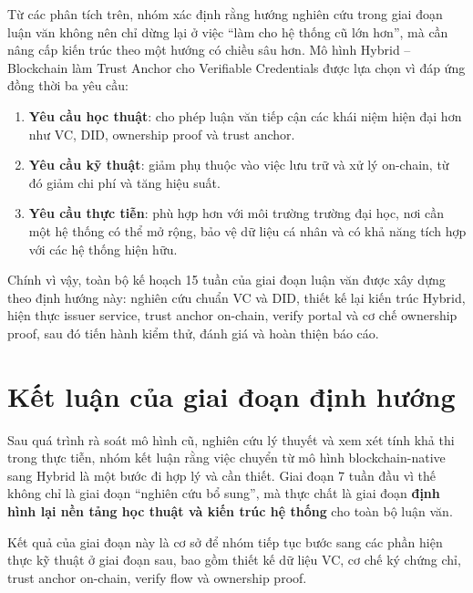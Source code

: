 Từ các phân tích trên, nhóm xác định rằng hướng nghiên cứu trong giai đoạn luận văn không nên chỉ dừng lại ở việc ``làm cho hệ thống cũ lớn hơn'', mà cần nâng cấp kiến trúc theo một hướng có chiều sâu hơn. Mô hình Hybrid -- Blockchain làm Trust Anchor cho Verifiable Credentials được lựa chọn vì đáp ứng đồng thời ba yêu cầu:

\begin{enumerate}
    \item \textbf{Yêu cầu học thuật}: cho phép luận văn tiếp cận các khái niệm hiện đại hơn như VC, DID, ownership proof và trust anchor.
    \item \textbf{Yêu cầu kỹ thuật}: giảm phụ thuộc vào việc lưu trữ và xử lý on-chain, từ đó giảm chi phí và tăng hiệu suất.
    \item \textbf{Yêu cầu thực tiễn}: phù hợp hơn với môi trường trường đại học, nơi cần một hệ thống có thể mở rộng, bảo vệ dữ liệu cá nhân và có khả năng tích hợp với các hệ thống hiện hữu.
\end{enumerate}

Chính vì vậy, toàn bộ kế hoạch 15 tuần của giai đoạn luận văn được xây dựng theo định hướng này: nghiên cứu chuẩn VC và DID, thiết kế lại kiến trúc Hybrid, hiện thực issuer service, trust anchor on-chain, verify portal và cơ chế ownership proof, sau đó tiến hành kiểm thử, đánh giá và hoàn thiện báo cáo.

\section{Kết luận của giai đoạn định hướng}

Sau quá trình rà soát mô hình cũ, nghiên cứu lý thuyết và xem xét tính khả thi trong thực tiễn, nhóm kết luận rằng việc chuyển từ mô hình blockchain-native sang Hybrid là một bước đi hợp lý và cần thiết. Giai đoạn 7 tuần đầu vì thế không chỉ là giai đoạn ``nghiên cứu bổ sung'', mà thực chất là giai đoạn \textbf{định hình lại nền tảng học thuật và kiến trúc hệ thống} cho toàn bộ luận văn.

Kết quả của giai đoạn này là cơ sở để nhóm tiếp tục bước sang các phần hiện thực kỹ thuật ở giai đoạn sau, bao gồm thiết kế dữ liệu VC, cơ chế ký chứng chỉ, trust anchor on-chain, verify flow và ownership proof.